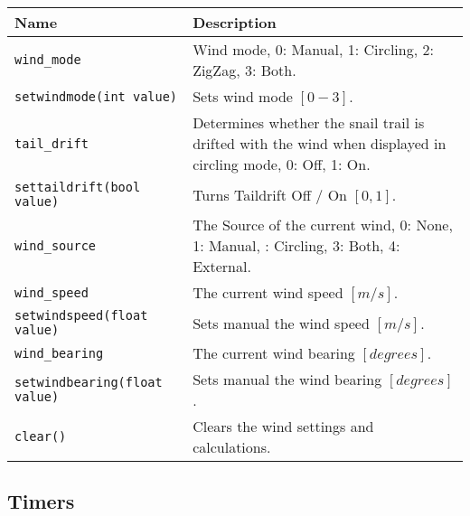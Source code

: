 \begin{maxipage}
\begin{tabularx}{1.9\textwidth}{l|X}
Name & Description \\
\hline\hline

\verb|wind_mode| & Wind mode, 0: Manual, 1: Circling, 2: ZigZag, 3: Both.\\

\hline

\verb|setwindmode(int value)| & Sets wind mode $[0-3]$.\\

\hline

\verb|tail_drift| & Determines whether the snail trail is drifted with the 
wind \newline when displayed in circling mode, 0: Off, 1: On. \\

\hline

\verb|settaildrift(bool value)| & Turns Taildrift Off / On $[{0,1}]$.\\

\hline

\verb|wind_source| & The Source of the current wind, 0: None, 1: Manual,
\newline 2: Circling, 3: Both, 4: External.\\

\hline

\verb|wind_speed| & The current wind speed 
$[{m/s}]$.\\

\hline

\verb|setwindspeed(float value)| & Sets manual the wind speed $[{m/s}]$.\\

\hline

\verb|wind_bearing| & The current wind bearing 
$[{degrees}]$.\\

\hline

\verb|setwindbearing(float value)| & Sets manual the wind bearing $[{degrees}]$.\\

\hline

\verb|clear()| & Clears the wind settings and calculations.\\

\hline

\end{tabularx}
\end{maxipage}

\subsection{Timers}

